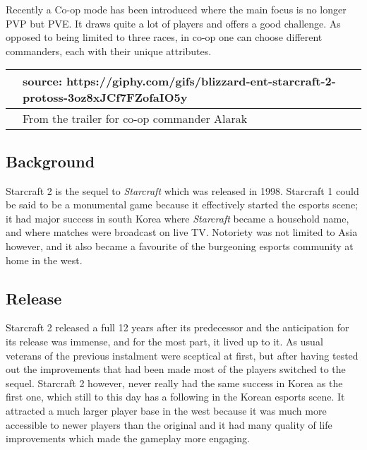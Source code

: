 \documentclass[a4paper,10pt]{book}
\begin{document}
        Recently a Co-op mode has been introduced where the main focus is no longer PVP but PVE. It draws quite a lot of
        players and offers a good challenge. As opposed to being limited to three races, in co-op one can choose different
        commanders, each with their unique attributes.
         
 \begin{longtable}{p{1mm}|l|}\hline
 
 &    source: https://giphy.com/gifs/blizzard-ent-starcraft-2-protoss-3oz8xJCf7FZofaIO5y  
 \\\hline
 
 & From the trailer for co-op commander Alarak 
 \\\hline
 \end{longtable}
 
 \subsection{Background }
 
          Starcraft 2 is the sequel to  \textit{Starcraft } which was released in 1998. Starcraft 1 could be said to be a
          monumental game because it effectively started the esports scene; it had major success in south
          Korea where  \textit{Starcraft } became a household name, and where matches were broadcast on live TV.
          Notoriety was not limited to Asia however, and it also became a favourite of the burgeoning esports
          community at home in the west.
         
 
 \subsection{Release }
 
          Starcraft 2 released a full 12 years after its predecessor and the anticipation for its release was
          immense, and for the most part, it lived up to it. As usual veterans of the previous instalment were
          sceptical at first, but after having tested out the improvements that had been made most of the
          players switched to the sequel. Starcraft 2 however, never really had the same success in Korea as
          the first one, which still to this day has a following in the Korean esports scene. It attracted a much
          larger player base in the west because it was much more accessible to newer players than the
          original and it had many quality of life improvements which made the gameplay more engaging.
         
\end{document}
